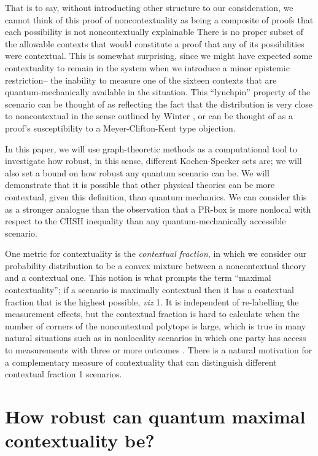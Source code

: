 \documentclass{amsart}
\theoremstyle{definition}
\begin{document}
That is to say, without introducting other structure to our consideration, we cannot think of this proof of noncontextuality as being a composite of proofs that each possibility is not noncontextually explainable There is no proper subset of the allowable contexts that would constitute a proof that any of its possibilities were contextual. This is somewhat surprising, since we might have expected some contextuality to remain in the system when we introduce a minor epistemic restriction-- the inability to measure one of the sixteen contexts that are quantum-mechanically available in the situation. This ``lynchpin'' property of the scenario can be thought of as reflecting the fact that the distribution is very close to noncontextual in the sense outlined by Winter \cite{Wint2014}, or can be thought of as a proof's susceptibility to a Meyer-Clifton-Kent type objection.

In this paper, we will use graph-theoretic methods as a computational tool to investigate how robust, in this sense, different Kochen-Specker sets are; we will also set a bound on how robust any quantum scenario can be. We will demonstrate that it is possible that other physical theories can be more contextual, given this definition, than quantum mechanics. We can consider this as a stronger analogue than the observation that a PR-box is more nonlocal with respect to the CHSH inequality than any quantum-mechanically accessible scenario.

One metric for contextuality is the \emph{contextual fraction},\cite{Abra2017} in which we consider our probability distribution to be a convex mixture between a noncontextual theory and a contextual one. This notion is what prompts the term ``maximal contextuality''; if a scenario is maximally contextual then it has a contextual fraction that is the highest possible, \emph{viz} 1. It is independent of re-labelling the measurement effects, but the contextual fraction is hard to calculate when the number of corners of the noncontextual polytope is large, which is true in many natural situations such as in nonlocality scenarios in which one party has access to measurements with three or more outcomes \cite{SimmCC}. There is a natural motivation for a complementary measure of contextuality that can distinguish different contextual fraction 1 scenarios.




\section{How robust can quantum maximal contextuality be?}
\end{document}
